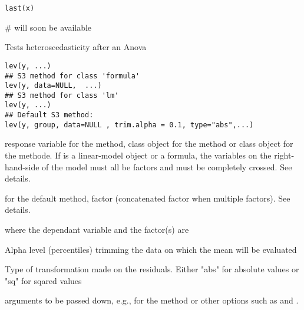 \documentclass[a4paper]{book}
\begin{document}
\newpage
{}
%
\begin{Usage}
\begin{verbatim}
last(x)
\end{verbatim}
\end{Usage}
%
\begin{Arguments}
\begin{ldescription}
\item[\code{x}] 


\end{ldescription}
\end{Arguments}
%
\begin{Examples}
\begin{ExampleCode}
# will soon be available
\end{ExampleCode}
\end{Examples}
\newpage
{}
%
\begin{Description}\relax
Tests heteroscedasticity after an Anova
\end{Description}
%
\begin{Usage}
\begin{verbatim}
lev(y, ...)
## S3 method for class 'formula'
lev(y, data=NULL,  ...)
## S3 method for class 'lm'
lev(y, ...)
## Default S3 method:
lev(y, group, data=NULL , trim.alpha = 0.1, type="abs",...)
\end{verbatim}
\end{Usage}
%
\begin{Arguments}
\begin{ldescription}
\item[\code{y}] response variable for the  method, 
class object for the  method or 
class object for the  methode. If 
is a linear-model object or a formula, the variables on the right-hand-side
of the model must all be factors and must be completely crossed. See details.
\item[\code{group}] for the default method, factor (concatenated factor when multiple factors). See details.
\item[\code{data}]  where the dependant variable and the factor(s) are
\item[\code{trim.alpha}] Alpha level (percentiles) trimming the data on which the mean will be evaluated
\item[\code{type}] Type of transformation made on the residuals. Either "abs" for absolute values or "sq" for sqared values
\item[\code{...}] arguments to be passed down, e.g.,  for the
 method or other options such as  and .
\end{ldescription}
\end{Arguments}
\end{document}

